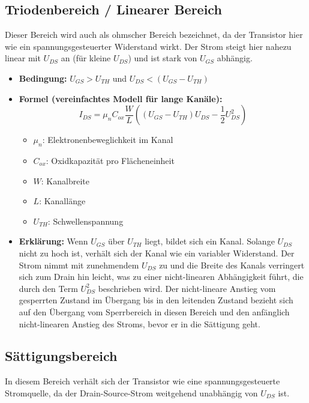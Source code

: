 \documentclass{scrarticle}
\numberwithin{equation}{section}
\begin{document}
\subsection{Triodenbereich / Linearer Bereich}
Dieser Bereich wird auch als ohmscher Bereich bezeichnet, da der Transistor hier wie ein spannungsgesteuerter Widerstand wirkt. Der Strom steigt hier nahezu linear mit $U_{DS}$ an (für kleine $U_{DS}$) und ist stark von $U_{GS}$ abhängig.

\begin{itemize}
	\item \textbf{Bedingung:} $U_{GS} > U_{TH}$ und $U_{DS} < (U_{GS} - U_{TH})$
	\item \textbf{Formel (vereinfachtes Modell für lange Kanäle):}
	\begin{equation*}
		I_{DS} = \mu_n C_{ox} \frac{W}{L} \left( (U_{GS} - U_{TH})U_{DS} - \frac{1}{2}U_{DS}^2 \right)
	\end{equation*}
	\begin{itemize}
		\item $\mu_n$: Elektronenbeweglichkeit im Kanal
		\item $C_{ox}$: Oxidkapazität pro Flächeneinheit
		\item $W$: Kanalbreite
		\item $L$: Kanallänge
		\item $U_{TH}$: Schwellenspannung
	\end{itemize}
	\item \textbf{Erklärung:} Wenn $U_{GS}$ über $U_{TH}$ liegt, bildet sich ein Kanal. Solange $U_{DS}$ nicht zu hoch ist, verhält sich der Kanal wie ein variabler Widerstand. Der Strom nimmt mit zunehmendem $U_{DS}$ zu und die Breite des Kanals verringert sich zum Drain hin leicht, was zu einer nicht-linearen Abhängigkeit führt, die durch den Term $U_{DS}^2$ beschrieben wird. Der nicht-lineare Anstieg vom gesperrten Zustand im Übergang bis in den leitenden Zustand bezieht sich auf den Übergang vom Sperrbereich in diesen Bereich und den anfänglich nicht-linearen Anstieg des Stroms, bevor er in die Sättigung geht.
\end{itemize}

\subsection{Sättigungsbereich}
In diesem Bereich verhält sich der Transistor wie eine spannungsgesteuerte Stromquelle, da der Drain-Source-Strom weitgehend unabhängig von $U_{DS}$ ist.
\end{document}
